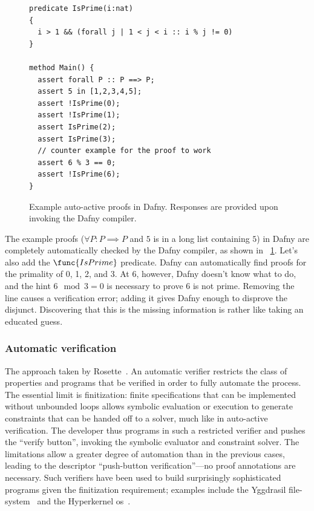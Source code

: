 \begin{figure}[ht]
\begin{verbatim}
predicate IsPrime(i:nat)
{
  i > 1 && (forall j | 1 < j < i :: i % j != 0)
}

method Main() {
  assert forall P :: P ==> P;
  assert 5 in [1,2,3,4,5];
  assert !IsPrime(0);
  assert !IsPrime(1);
  assert IsPrime(2);
  assert IsPrime(3);
  // counter example for the proof to work
  assert 6 % 3 == 0;
  assert !IsPrime(6);
}
\end{verbatim}
    \caption{Example auto-active proofs in Dafny. Responses are provided upon
    invoking the Dafny compiler.}\label{F:dafny_ex}
\end{figure}

The example proofs (\(\forall P: P \implies P\) and \(5\) is in a long list
containing \(5\)) in Dafny are completely automatically checked by the Dafny
compiler, as shown in \figurename~\ref{F:dafny_ex}. Let's also add the
\(\func{IsPrime}\) predicate. Dafny can automatically find proofs for the
primality of 0, 1, 2, and 3. At 6, however, Dafny doesn't know what to do, and
the hint \(6 \mod 3 = 0\) is necessary to prove 6 is not prime. Removing the
line causes a verification error; adding it gives Dafny enough to disprove the
disjunct. Discovering that this is the missing information is rather like taking
an educated guess.

\subsubsection{Automatic verification}

The approach taken by Rosette~\cite{Torlak_2013}. An automatic verifier
restricts the class of properties and programs that be verified in order to
fully automate the process. The essential limit is finitization: finite
specifications that can be implemented without unbounded loops allows symbolic
evaluation or execution to generate constraints that can be handed off to a
solver, much like in auto-active verification. The developer thus programs in
such a restricted verifier and pushes the ``verify button'', invoking the symbolic
evaluator and constraint solver. The limitations allow a greater degree of
automation than in the previous cases, leading to the descriptor ``push-button
verification''---no proof annotations are necessary. Such verifiers have been used
to build surprisingly sophisticated programs given the finitization requirement;
examples include the Yggdrasil file-system~\cite{Sigurbjarnarson_2016} and the
Hyperkernel \gls{os}~\cite{Nelson_2017}.

